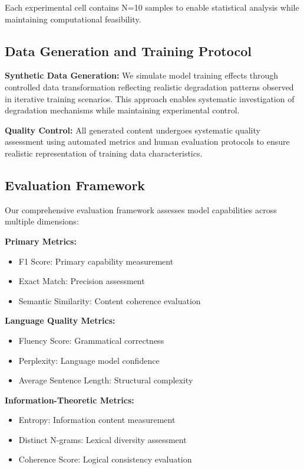\documentclass[letterpaper]{article}
\begin{document}
Each experimental cell contains N=10 samples to enable statistical analysis while maintaining computational feasibility.

\subsection{Data Generation and Training Protocol}

\textbf{Synthetic Data Generation:} We simulate model training effects through controlled data transformation reflecting realistic degradation patterns observed in iterative training scenarios. This approach enables systematic investigation of degradation mechanisms while maintaining experimental control.

\textbf{Quality Control:} All generated content undergoes systematic quality assessment using automated metrics and human evaluation protocols to ensure realistic representation of training data characteristics.

\subsection{Evaluation Framework}

Our comprehensive evaluation framework assesses model capabilities across multiple dimensions:

\textbf{Primary Metrics:}
\begin{itemize}
\item F1 Score: Primary capability measurement
\item Exact Match: Precision assessment
\item Semantic Similarity: Content coherence evaluation
\end{itemize}

\textbf{Language Quality Metrics:}
\begin{itemize}
\item Fluency Score: Grammatical correctness
\item Perplexity: Language model confidence
\item Average Sentence Length: Structural complexity
\end{itemize}

\textbf{Information-Theoretic Metrics:}
\begin{itemize}
\item Entropy: Information content measurement
\item Distinct N-grams: Lexical diversity assessment
\item Coherence Score: Logical consistency evaluation
\end{itemize}
\end{document}
